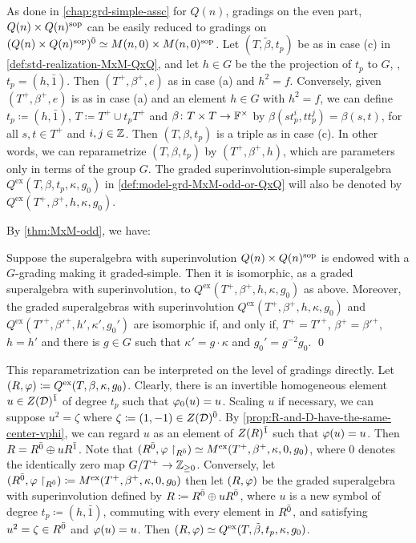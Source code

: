 As done in \cref{chap:grd-simple-assc} for $Q(n)$, gradings on the even part, $Q(n)\times Q(n)^{\mathrm{sop}}$ can be easily reduced to gradings on $(Q(n)\times Q(n)^{\mathrm{sop}})^{\bar0} \simeq M(n, 0) \times M(n, 0) ^{\mathrm{sop}}$. 
Let $(T, \tilde\beta, t_p)$ be as in case (c) in \cref{def:std-realization-MxM-QxQ}, and let $h\in G$ be the the projection of $t_p$ to $G$, \ie, $t_p = (h, \bar 1)$. 
Then $(T^+, \beta^+, e)$ as in case (a) and $h^2 = f$. 
Conversely, given $(T^+, \beta^+, e)$ is as in case (a) and an element $h\in G$ with $h^2 = f$, we can define $t_p \coloneqq (h, \bar 1)$, $T \coloneqq T^+ \cup t_p T^+$ and $\beta\colon T\times T \to \mathbb{F}^\times$ by $\beta(s t_p^i, t t_p^j) = \beta(s,t)$, for all $s, t \in T^+$ and $i, j \in \mathbb{Z}$. 
Then $(T, \beta, t_p)$ is a triple as in case (c). 
In other words, we can reparametrize $(T, \beta, t_p)$ by $(T^+, \beta^+, h)$, which are parameters only in terms of the group $G$. 
The graded superinvolution-simple superalgebra $Q^{\mathrm{ex}} (T, \beta, t_p, \kappa, g_0)$ in \cref{def:model-grd-MxM-odd-or-QxQ} will also be denoted by $Q^{\mathrm{ex}} (T^+, \beta^+,  h, \kappa, g_0)$. 

By \cref{thm:MxM-odd}, we have:

\begin{cor}\label{cor:QxQ-reduced-to-MxM}
    Suppose the superalgebra with superinvolution $Q(n) \times Q(n)^{\mathrm{sop}}$ is endowed with a $G$-grading making it graded-simple. 
    Then it is isomorphic, as a graded superalgebra with superinvolution, to $Q^{\mathrm{ex}}(T^+,\beta^+, h, \kappa, g_0)$ as above. 
    Moreover, the graded superalgebras with superinvolution $Q^{\mathrm{ex}} (T^+, \beta^+,  h, \kappa, g_0)$ and $Q^{\mathrm{ex}} (T'^+, \beta'^+,  h', \kappa', g_0')$ are isomorphic if, and only if, $T^+ =T'^+$, $\beta^+ = \beta'^+$, $h = h'$ and there is $g \in G$ such that $\kappa' = g\cdot\kappa$ and $g_0' = g^{-2}g_0$. \qed
\end{cor}

This reparametrization can be interpreted on the level of gradings directly. 
Let $(R, \varphi) \coloneqq Q^{\mathrm{ex}} (T, \beta, \kappa, g_0)$. 
Clearly, there is an invertible homogeneous element $u \in Z(\mathcal{D})^{\bar1}$ of degree $t_p$ such that $\varphi_0(u) = u$. 
Scaling $u$ if necessary, we can suppose $u^2 = \zeta$ where $\zeta \coloneqq (1, -1) \in Z(\mathcal{D})^{\bar0}$. 
By \cref{prop:R-and-D-have-the-same-center-vphi}, we can regard $u$ as an element of $Z(R)^{\bar1}$ such that $\varphi(u) = u$. 
Then $R = R^{\bar0} \oplus u R^{\bar1}$. 
Note that ${(R^{\bar0}, \varphi\restriction_{R^{\bar0}})} \simeq M^{\mathrm{ex}} (T^+, \beta^+, \kappa, 0, g_0)$, where $0$ denotes the identically zero map $G/T^+ \to \mathbb{Z}_{\geq 0}$. 
Conversely, let $(R^{\bar0}, \varphi\restriction_{R^{\bar0}}) \coloneqq M^{\mathrm{ex}} (T^+, \beta^+, \kappa, 0, g_0)$ then let $(R, \varphi)$ be the graded superalgebra with superinvolution defined by $R \coloneqq R^{\bar0} \oplus u R^{\bar0}$, where $u$ is a new symbol of degree $t_p \coloneqq (h, \bar 1)$, commuting with every element in $R^{\bar0}$, and satisfying $u^2 = \zeta \in R^{\bar0}$ and $\varphi(u) = u$. 
Then $(R, \varphi) \simeq Q^{\mathrm{ex}} (T, \tilde\beta, t_p, \kappa, g_0)$. 

